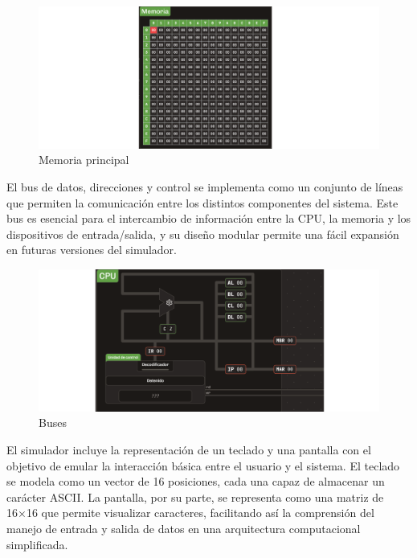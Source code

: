 \documentclass[12pt,oneside]{templates/unerthesis}
\begin{document}
\begin{figure}

{\centering \includegraphics[width=0.85\linewidth]{images/memoria} 

}

\caption{Memoria principal}\label{fig:memoria}
\end{figure}

El bus de datos, direcciones y control se implementa como un conjunto de líneas que permiten la comunicación entre los distintos componentes del sistema. Este bus es esencial para el intercambio de información entre la CPU, la memoria y los dispositivos de entrada/salida, y su diseño modular permite una fácil expansión en futuras versiones del simulador.

\begin{figure}

{\centering \includegraphics[width=0.85\linewidth]{images/buses} 

}

\caption{Buses}\label{fig:buses}
\end{figure}

El simulador incluye la representación de un teclado y una pantalla con el objetivo de emular la interacción básica entre el usuario y el sistema. El teclado se modela como un vector de 16 posiciones, cada una capaz de almacenar un carácter ASCII. La pantalla, por su parte, se representa como una matriz de 16×16 que permite visualizar caracteres, facilitando así la comprensión del manejo de entrada y salida de datos en una arquitectura computacional simplificada.
\end{document}
